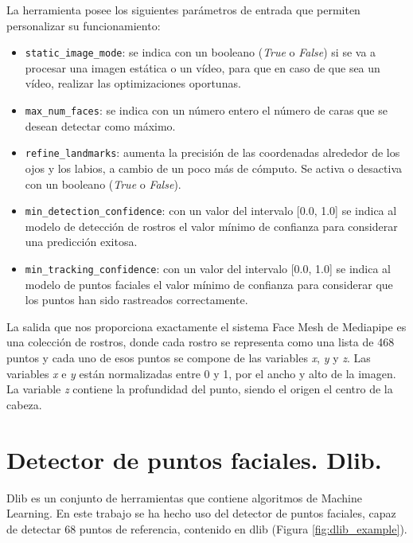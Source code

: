 La herramienta posee los siguientes parámetros de entrada que permiten personalizar su funcionamiento:
\begin{itemize}
    \item \verb|static_image_mode|: se indica con un booleano (\textit{True} o \textit{False}) si se va a procesar una imagen estática o un vídeo, para que en caso de que sea un vídeo, realizar las optimizaciones oportunas.
    
    \item \verb|max_num_faces|: se indica con un número entero el número de caras que se desean detectar como máximo.
    
    \item \verb|refine_landmarks|: aumenta la precisión de las coordenadas alrededor de los ojos y los labios, a cambio de un poco más de cómputo. Se activa o desactiva con un booleano (\textit{True} o \textit{False}).
    
    \item \verb|min_detection_confidence|: con un valor del intervalo [0.0, 1.0] se indica al modelo de detección de rostros el valor mínimo de confianza para considerar una predicción exitosa.
    
    \item \verb|min_tracking_confidence|: con un valor del intervalo [0.0, 1.0] se indica al modelo de puntos faciales el valor mínimo de confianza para considerar que los puntos han sido rastreados correctamente.
\end{itemize}

La salida que nos proporciona exactamente el sistema Face Mesh de Mediapipe es una colección de rostros, donde cada rostro se representa como una lista de 468 puntos y cada uno de esos puntos se compone de las variables \textit{x}, \textit{y} y \textit{z}. Las variables \textit{x} e \textit{y} están normalizadas entre 0 y 1, por el ancho y alto de la imagen. La variable \textit{z} contiene la profundidad del punto, siendo el origen el centro de la cabeza.

\section{Detector de puntos faciales. Dlib.}

Dlib es un conjunto de herramientas que contiene algoritmos de Machine Learning. En este trabajo se ha hecho uso del detector de puntos faciales, capaz de detectar 68 puntos de referencia, contenido en dlib (Figura \ref{fig:dlib_example}).\\

